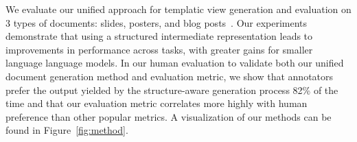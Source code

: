We evaluate our unified approach for templatic view generation and evaluation on 3 types of documents: slides, posters, and blog posts~\cite{Fu2021DOC2PPTAP,Qiang2016LearningTG,chandrasekaran2020overview}. %
Our experiments demonstrate that using a structured intermediate representation leads to improvements in performance across tasks, with greater gains for smaller language language models.
In our human evaluation to validate both our unified document generation method and evaluation metric, we show that annotators prefer the output yielded by the structure-aware generation process 82\% of the time and that our evaluation metric correlates more highly with human preference than other popular metrics. A visualization of our methods can be found in Figure~\ref{fig:method}. 
